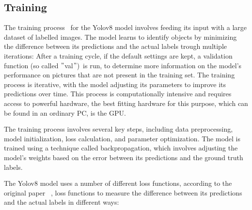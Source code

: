 \subsection{Training}\label{subsec:training}
The training process~\cite{redmon2016lookonceunifiedrealtime} for the Yolov8 model involves feeding its input with a large dataset of labelled images.
The model learns to identify objects by minimizing the difference between its predictions and the actual labels trough multiple iterations:
After a training cycle, if the default settings are kept, a validation function (so called \("\)val\("\))\ is run,
to determine more information on the model's performance on pictures that are not present in the training set.
The training process is iterative, with the model adjusting its parameters to improve its predictions over time.
This process is computationally intensive and requires access to powerful hardware,
the best fitting hardware for this purpose, which can be found in an ordinary PC, is the GPU\@.

The training process involves several key steps, including data preprocessing, model initialization,
loss calculation, and parameter optimization.
The model is trained using a technique called backpropagation, which involves adjusting the model's weights based on
the error between its predictions and the ground truth labels.

The Yolov8 model uses a number of different loss functions, according to the original paper~\cite{redmon2016lookonceunifiedrealtime}
, loss functions to measure the difference between its predictions and the actual labels in different ways:
\newpage


